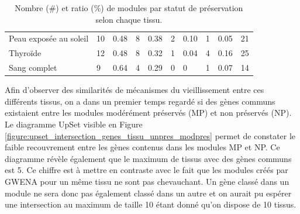 \begin{table}[h]
{\begin{tabular}{llllllllll}
Peau exposée au soleil          & 10                & 0.48              & 8                       & 0.38                   & 2                   & 0.10                & 1                    & 0.05                & 21             \\
Thyroïde                        & 12                & 0.48              & 8                       & 0.32                   & 1                   & 0.04                & 4                    & 0.16                & 25             \\
Sang complet                    & 9                 & 0.64              & 4                       & 0.29                   & 0                   & 0                   & 1                    & 0.07                & 14              
\end{tabular}
}
\caption{Nombre (\#) et ratio (\%) de modules par statut de préservation selon chaque tissu.}
\label{table:modules_status_all_tissues}
\end{table}


Afin d'observer des similarités de mécanismes du vieillissement entre ces différents tissus, on a dans un premier temps regardé si des gènes communs existaient entre les modules modérément préservés (MP) et non  préservés (NP). Le diagramme UpSet visible en Figure \ref{figure:upset_intersection_genes_tissu_unpres_modpres}  permet de constater le faible recouvrement entre les gènes contenus dans les modules MP et NP. Ce diagramme révèle également que le maximum de tissus avec des gènes communs est 5. Ce chiffre est à mettre en contraste avec le fait que les modules créés par GWENA pour un même tissu ne sont pas chevauchant. Un gène classé dans un module ne sera donc pas également classé dans un autre et on aurait pu espérer une intersection au maximum de taille 10 étant donné qu'on dispose de 10 tissus. 


